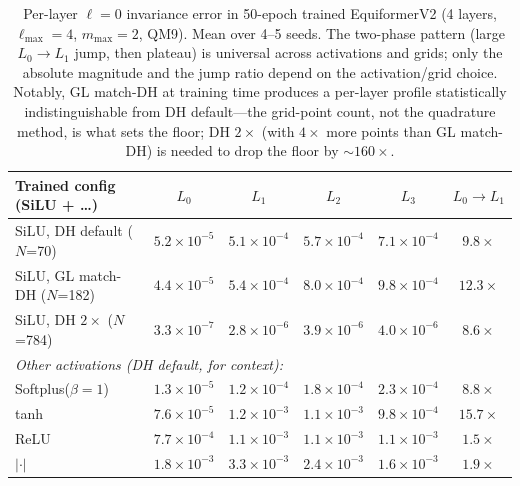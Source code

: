 \documentclass{article}
\begin{document}
\begin{table}[t]
  \centering
  \caption{Per-layer $\ell{=}0$ invariance error in 50-epoch trained
  EquiformerV2 (4 layers, $\ell_{\max}{=}4$, $m_{\max}{=}2$, QM9).
  Mean over 4--5 seeds. The two-phase pattern (large $L_0 \to L_1$
  jump, then plateau) is universal across activations and grids; only
  the absolute magnitude and the jump ratio depend on the
  activation/grid choice. Notably, GL match-DH at training time
  produces a per-layer profile statistically indistinguishable from
  DH default---the grid-point count, not the quadrature method, is
  what sets the floor; DH $2\times$ (with $4\times$ more points than
  GL match-DH) is needed to drop the floor by $\sim 160\times$.}
  \label{tab:perlayer}
  \small
  \begin{tabular}{lcccc c}
    \toprule
    Trained config (SiLU + …) & $L_0$ & $L_1$ & $L_2$ & $L_3$ & $L_0 \!\to\! L_1$ \\
    \midrule
    SiLU, DH default ($N$=70)        & $5.2\!\times\!10^{-5}$ & $5.1\!\times\!10^{-4}$ & $5.7\!\times\!10^{-4}$ & $7.1\!\times\!10^{-4}$ & $9.8\times$ \\
    SiLU, GL match-DH ($N$=182)      & $4.4\!\times\!10^{-5}$ & $5.4\!\times\!10^{-4}$ & $8.0\!\times\!10^{-4}$ & $9.8\!\times\!10^{-4}$ & $12.3\times$ \\
    SiLU, DH $2\times$ ($N$=784)     & $3.3\!\times\!10^{-7}$ & $2.8\!\times\!10^{-6}$ & $3.9\!\times\!10^{-6}$ & $4.0\!\times\!10^{-6}$ & $8.6\times$ \\
    \midrule
    \multicolumn{6}{l}{\emph{Other activations (DH default, for context):}} \\
    Softplus($\beta{=}1$)   & $1.3\!\times\!10^{-5}$ & $1.2\!\times\!10^{-4}$ & $1.8\!\times\!10^{-4}$ & $2.3\!\times\!10^{-4}$ & $8.8\times$ \\
    tanh                    & $7.6\!\times\!10^{-5}$ & $1.2\!\times\!10^{-3}$ & $1.1\!\times\!10^{-3}$ & $9.8\!\times\!10^{-4}$ & $15.7\times$ \\
    ReLU                    & $7.7\!\times\!10^{-4}$ & $1.1\!\times\!10^{-3}$ & $1.1\!\times\!10^{-3}$ & $1.1\!\times\!10^{-3}$ & $1.5\times$ \\
    $|\cdot|$               & $1.8\!\times\!10^{-3}$ & $3.3\!\times\!10^{-3}$ & $2.4\!\times\!10^{-3}$ & $1.6\!\times\!10^{-3}$ & $1.9\times$ \\
    \bottomrule
  \end{tabular}
\end{table}
\end{document}

